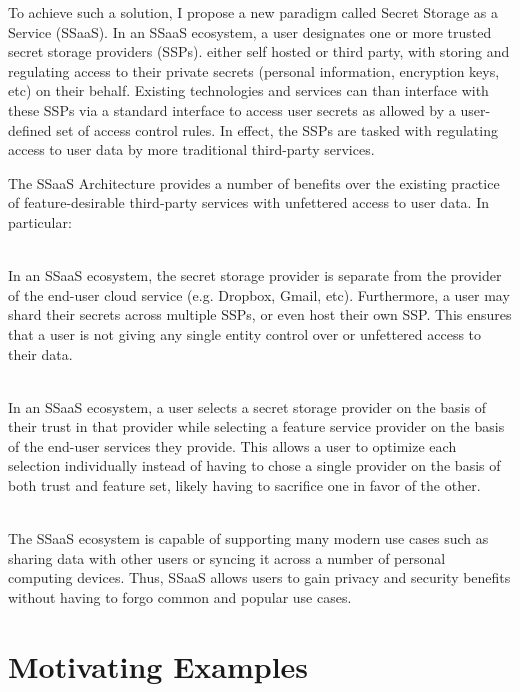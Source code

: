 To achieve such a solution, I propose a new paradigm called Secret
Storage as a Service (SSaaS). In an SSaaS ecosystem, a user designates
one or more trusted secret storage providers (SSPs). either self
hosted or third party, with storing and regulating access to their
private secrets (personal information, encryption keys, etc) on their
behalf. Existing technologies and services can than interface with
these SSPs via a standard interface to access user secrets as allowed
by a user-defined set of access control rules. In effect, the SSPs are
tasked with regulating access to user data by more traditional
third-party services.

The SSaaS Architecture provides a number of benefits over the existing
practice of feature-desirable third-party services with unfettered
access to user data. In particular:

\begin{packed_desc}
\item[No Single Trusted Third Party] \hfill \\ In an SSaaS ecosystem,
  the secret storage provider is separate from the provider of the
  end-user cloud service (e.g. Dropbox, Gmail, etc). Furthermore, a
  user may shard their secrets across multiple SSPs, or even host
  their own SSP. This ensures that a user is not giving any single
  entity control over or unfettered access to their data.
\item[Separation of Duties] \hfill \\ In an SSaaS ecosystem, a user
  selects a secret storage provider on the basis of their trust in
  that provider while selecting a feature service provider on the
  basis of the end-user services they provide. This allows a user to
  optimize each selection individually instead of having to chose a
  single provider on the basis of both trust and feature set, likely
  having to sacrifice one in favor of the other.
\item[Support for Existing Use Cases] \hfill \\ The SSaaS ecosystem is
  capable of supporting many modern use cases such as sharing data
  with other users or syncing it across a number of personal computing
  devices. Thus, SSaaS allows users to gain privacy and security
  benefits without having to forgo common and popular use cases.
\end{packed_desc}

\section{Motivating Examples}
\label{chap:intro:example}

